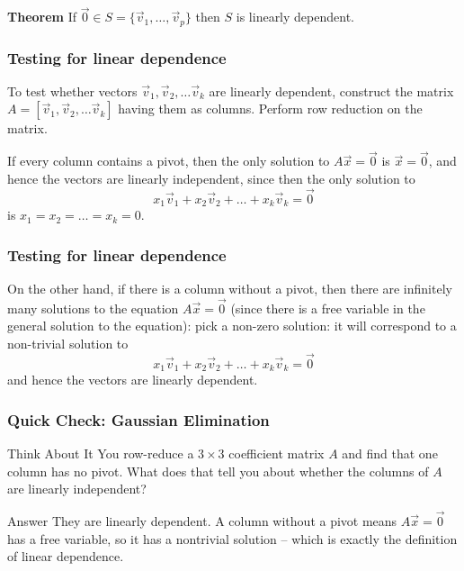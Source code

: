   \begin{frame}[fragile]
\textbf{Theorem}
 If $\vec{0} \in S = \{ \vec{v}_1, \dots , \vec{v}_p \}$ 
 then $S$ is linearly dependent.

%
%
%
%
\end{frame}

  \begin{frame}[fragile]\frametitle{Testing for linear dependence}
To test whether vectors $\vec{v}_1, \vec{v}_2, \dots \vec{v}_k$ are linearly 
dependent, construct the matrix $A=[\vec{v}_1, \vec{v}_2, \dots \vec{v}_k]$ having them as columns.  
Perform row reduction on the matrix.

If every column contains a pivot, then the only solution to $A \vec{x} = \vec{0}$
is $\vec{x}=\vec{0}$, and hence the vectors are linearly independent, since then
the only solution to 
\[
 x_1 \vec{v}_1 + x_2 \vec{v}_2  + \dots + x_k \vec{v}_k = \vec{0}
\]
is $x_1=x_2=\dots=x_k=0$.
\end{frame}

  \begin{frame}[fragile]\frametitle{Testing for linear dependence}
On the other hand, if there is a column without a pivot, then there are infinitely many 
solutions to the equation $A \vec{x} = \vec{0}$ (since there is a free 
variable in the general solution to the equation): pick a non-zero solution: it 
will correspond to a non-trivial solution to
\[
 x_1 \vec{v}_1 + x_2 \vec{v}_2  + \dots + x_k \vec{v}_k = \vec{0}
\]
and hence the vectors are linearly dependent.
\end{frame}

\begin{frame}[fragile]\frametitle{Quick Check: Gaussian Elimination}
\begin{block}{Think About It}
You row-reduce a $3\times3$ coefficient matrix $A$ and find that one column has no pivot. What does that tell you about whether the columns of $A$ are linearly independent?
\end{block}
\pause
\begin{block}{Answer}
They are linearly dependent. A column without a pivot means $A\vec{x}=\vec{0}$ has a free variable, so it has a nontrivial solution -- which is exactly the definition of linear dependence.
\end{block}
\end{frame}

